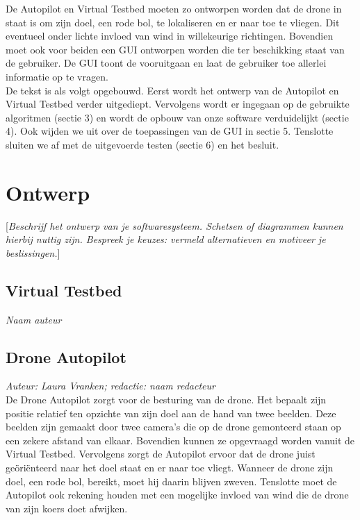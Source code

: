 \documentclass[tt]{penoverslag}
\begin{document}
De Autopilot en Virtual Testbed moeten zo ontworpen worden dat de drone in staat is om zijn doel, een rode bol, te lokaliseren en er naar toe te vliegen. Dit eventueel onder lichte invloed van wind in willekeurige richtingen. Bovendien moet ook voor beiden een GUI ontworpen worden die ter beschikking staat van de gebruiker. De GUI toont de vooruitgaan en laat de gebruiker toe allerlei informatie op te vragen. \\

De tekst is als volgt opgebouwd. Eerst wordt het ontwerp van de Autopilot en Virtual Testbed verder uitgediept. Vervolgens wordt er ingegaan op de gebruikte algoritmen (sectie 3) en wordt de opbouw van onze software verduidelijkt (sectie 4). Ook wijden we uit over de toepassingen van de GUI in sectie 5. Tenslotte sluiten we af met de uitgevoerde testen (sectie 6) en het besluit. \\


\section{Ontwerp}

[{\em Beschrijf het ontwerp van je softwaresysteem.  Schetsen of diagrammen kunnen hierbij nuttig zijn.  Bespreek je keuzes: vermeld alternatieven en motiveer je beslissingen.}]


\subsection{Virtual Testbed}

{\em Naam auteur}\\


\subsection{Drone Autopilot}

{\em Auteur: Laura Vranken; redactie: naam redacteur}\\
De Drone Autopilot zorgt voor de besturing van de drone. Het bepaalt zijn positie relatief ten opzichte van zijn doel aan de hand van twee beelden. Deze beelden zijn gemaakt door twee camera's die op de drone gemonteerd staan op een zekere afstand van elkaar. Bovendien kunnen ze opgevraagd worden vanuit de Virtual Testbed. Vervolgens zorgt de Autopilot ervoor dat de drone juist ge\"ori\"enteerd naar het doel staat en er naar toe vliegt. Wanneer de drone zijn doel,  een rode bol, bereikt, moet hij daarin blijven zweven. Tenslotte moet de Autopilot ook rekening houden met een mogelijke invloed van wind die de drone van zijn koers doet afwijken.\\
\end{document}
